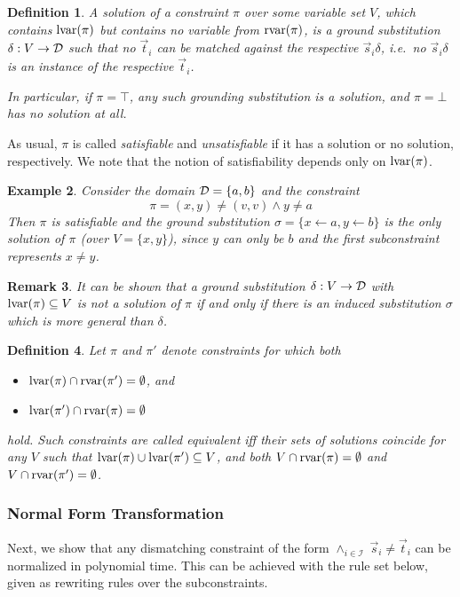 \documentclass[a4paper]{article}
\newtheorem{defi}{Definition}[section]
\newtheorem{remark}[defi]{Remark}
\newtheorem{example}[defi]{Example}
\begin{document}
\begin{defi}
A \emph{solution} of a constraint $\pi$ over some variable set $V$, which contains $\operatorname{lvar}(\pi)$ but contains no variable from $\operatorname{rvar}(\pi)$, 
is a ground substitution $\delta: V \rightarrow \mathcal{D}$ such that 
no $\vec{t}_i$ can be matched against the respective $\vec{s}_i\delta$, i.e.\
no $\vec{s}_i\delta$ is an instance of the respective $\vec{t}_i$.

In particular, if $\pi = \top$, any such grounding substitution is a solution, and $\pi = \bot$ has no solution at all.
\end{defi}

\noindent
As usual, $\pi$ is called \emph{satisfiable} and \emph{unsatisfiable} if it has a solution or no solution, respectively. 
We note that the notion of satisfiability depends only on $\operatorname{lvar}(\pi)$.

\begin{example} Consider the domain $\mathcal{D} = \{a, b\}$ and the constraint 
$$\pi = (x,y) \ne (v,v) \land y \ne a$$
Then $\pi$ is satisfiable and the ground substitution $\sigma = \{x \gets a, y \gets b\}$ 
is the only solution of $\pi$ (over $V = \{x,y\}$), since $y$ can only be $b$ and the first 
subconstraint represents $x \ne y$.
\end{example}

\begin{remark}\label{a-inducedsubst-remark}
It can be shown that a ground substitution $\delta: V \rightarrow \mathcal{D}$ with $\operatorname{lvar}(\pi) \subseteq V$ 
is not a solution of $\pi$ 
if and only if there is an induced substitution $\sigma$ which is more general than $\delta$.
\end{remark}

\begin{defi}
Let $\pi$ and $\pi'$ denote constraints for which both
\begin{itemize}
\item $\operatorname{lvar}(\pi)\cap\operatorname{rvar}(\pi') = \emptyset$, and
\item $\operatorname{lvar}(\pi')\cap\operatorname{rvar}(\pi) = \emptyset$ 
\end{itemize}
hold.
Such constraints are called \emph{equivalent} iff their sets of solutions coincide for any $V$ such that 
$\operatorname{lvar}(\pi) \cup \operatorname{lvar}(\pi') \subseteq V$, and both
$V \cap \operatorname{rvar}(\pi) = \emptyset$ and 
$V \cap \operatorname{rvar}(\pi') = \emptyset$.
\end{defi}

\subsubsection*{Normal Form Transformation}
Next, we show that any dismatching constraint of the form $\land_{i \in \mathcal{I}}~\vec{s}_i \ne \vec{t}_i$ 
can be normalized in polynomial time. This can be achieved with the rule set below, given as rewriting rules over the subconstraints.
\end{document}
